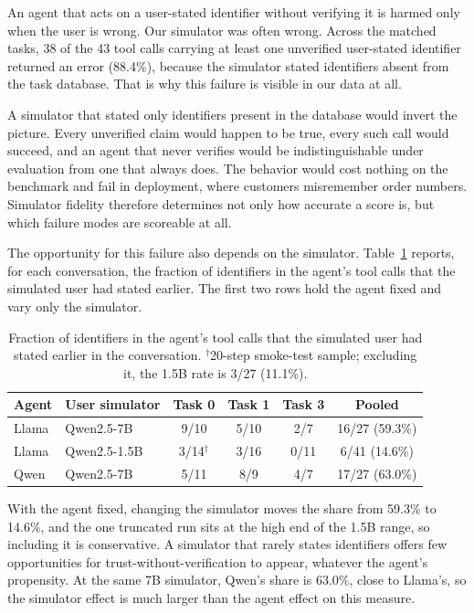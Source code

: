 \documentclass{article}
\begin{document}
An agent that acts on a user-stated identifier without verifying it is harmed only when the user is wrong. Our simulator was often wrong. Across the matched tasks, 38 of the 43 tool calls carrying at least one unverified user-stated identifier returned an error (88.4\%), because the simulator stated identifiers absent from the task database. That is why this failure is visible in our data at all.

A simulator that stated only identifiers present in the database would invert the picture. Every unverified claim would happen to be true, every such call would succeed, and an agent that never verifies would be indistinguishable under evaluation from one that always does. The behavior would cost nothing on the benchmark and fail in deployment, where customers misremember order numbers. Simulator fidelity therefore determines not only how accurate a score is, but which failure modes are scoreable at all.

The opportunity for this failure also depends on the simulator. Table~\ref{tab:exposure} reports, for each conversation, the fraction of identifiers in the agent's tool calls that the simulated user had stated earlier. The first two rows hold the agent fixed and vary only the simulator.

\begin{table}[h]
\centering
\caption{Fraction of identifiers in the agent's tool calls that the simulated user had stated earlier in the conversation. $^\dagger$20-step smoke-test sample; excluding it, the 1.5B rate is 3/27 (11.1\%).}
\label{tab:exposure}
\begin{tabular}{llcccc}
\toprule
Agent & User simulator & Task 0 & Task 1 & Task 3 & Pooled \\
\midrule
Llama & Qwen2.5-7B & 9/10 & 5/10 & 2/7 & 16/27 (59.3\%) \\
Llama & Qwen2.5-1.5B & 3/14$^\dagger$ & 3/16 & 0/11 & 6/41 (14.6\%) \\
Qwen & Qwen2.5-7B & 5/11 & 8/9 & 4/7 & 17/27 (63.0\%) \\
\bottomrule
\end{tabular}
\end{table}

With the agent fixed, changing the simulator moves the share from 59.3\% to 14.6\%, and the one truncated run sits at the high end of the 1.5B range, so including it is conservative. A simulator that rarely states identifiers offers few opportunities for trust-without-verification to appear, whatever the agent's propensity. At the same 7B simulator, Qwen's share is 63.0\%, close to Llama's, so the simulator effect is much larger than the agent effect on this measure.
\end{document}
